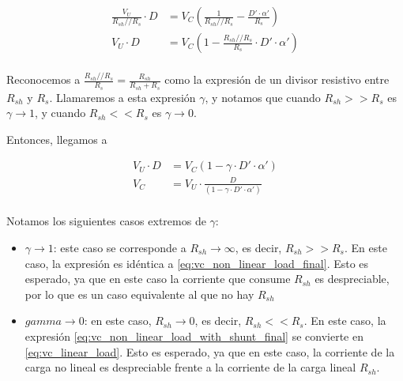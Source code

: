 \begin{equation}
    \label{eq:vc_non_linear_load_with_shunt_2}
    \begin{aligned}
        \frac{V_U}{R_{sh} // R_{s}} \cdot D &= V_C \left( \frac{1}{R_{sh} //
        R_{s}} - \frac{D' \cdot \alpha'}{R_s} \right) \\
        V_U \cdot D &= V_C \left( 1 - \frac{R_{sh} // R_{s}}{R_s} \cdot D' \cdot
        \alpha'\right) \\
    \end{aligned}
\end{equation}

Reconocemos a $\frac{R_{sh} // R_{s}}{R_s} = \frac{R_{sh}}{R_{sh}+R_s}$ como la
expresión de un divisor resistivo entre $R_{sh}$ y $R_s$. Llamaremos a esta
expresión $\gamma$, y notamos que cuando $R_{sh} >> R_s$ es $\gamma \to 1$, y
cuando $R_{sh} << R_s$ es $\gamma \to 0$.

Entonces, llegamos a

\begin{equation}
    \label{eq:vc_non_linear_load_with_shunt_final}
    \begin{aligned}
        V_U \cdot D &= V_C \left( 1 - \gamma \cdot D' \cdot \alpha'\right) \\
        V_C &= V_U \cdot \frac{D}{\left( 1 - \gamma \cdot D' \cdot \alpha'\right)} \\
    \end{aligned}
\end{equation}

Notamos los siguientes casos extremos de $\gamma$:

\begin{itemize}
    \item $\gamma \to 1$: este caso se corresponde a $R_{sh} \to \infty$, es
        decir, $R_{sh} >> R_s$. En este caso, la expresión es idéntica a
        \ref{eq:vc_non_linear_load_final}. Esto es esperado, ya que en este caso
        la corriente que consume $R_{sh}$ es despreciable, por lo que es un caso
        equivalente al que no hay $R_{sh}$
    \item $gamma \to 0$: en este caso, $R_{sh} \to 0$, es decir, $R_{sh} <<
        R_s$. En este caso, la expresión
        \ref{eq:vc_non_linear_load_with_shunt_final} se convierte en
        \ref{eq:vc_linear_load}. Esto es esperado, ya que en este caso, la
        corriente de la carga no lineal es despreciable frente a la corriente
        de la carga lineal $R_{sh}$.
\end{itemize}

